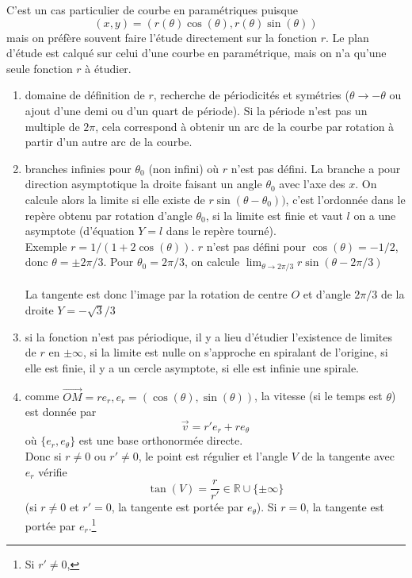 \documentclass[a4paper,11pt]{book}
\begin{document}
\begin{giacjshere}
C'est un cas particulier de courbe en param\'etriques puisque
$$ (x,y)=(r(\theta) \cos(\theta), r(\theta) \sin(\theta))$$
mais on pr\'ef\`ere souvent faire l'\'etude directement sur la
fonction $r$. Le plan d'\'etude est calqu\'e sur celui
d'une courbe en param\'etrique, mais on n'a qu'une seule fonction
$r$ \`a \'etudier.
\begin{enumerate}
\item domaine de d\'efinition de $r$, recherche
de p\'eriodicit\'es et sym\'etries ($\theta \rightarrow -\theta$
ou ajout d'une demi ou d'un quart de p\'eriode).
Si la période n'est pas un multiple de $2\pi$, cela correspond
à obtenir un arc de la courbe par rotation à partir d'un autre arc
de la courbe.
\item branches infinies pour $\theta_0$ (non infini)
où $r$ n'est pas d\'efini. La branche a pour direction
asymptotique la droite faisant un angle $\theta_0$ avec
l'axe des $x$. On calcule alors la limite si elle existe de 
$r \sin(\theta-\theta_0))$, c'est l'ordonnée dans
le repère obtenu par rotation d'angle $\theta_0$, si la limite
est finie et vaut $l$
on a une asymptote (d'équation $Y=l$ dans le repère tourné).\\
Exemple $r=1/(1+2\cos(\theta))$. $r$ n'est pas d\'efini pour
$\cos(\theta)=-1/2$, donc $\theta=\pm 2\pi/3$. Pour $\theta_0=2\pi/3$,
on calcule $\lim_{\theta \rightarrow 2\pi/3}r\sin(\theta-2\pi/3)$\\
\\
La tangente est donc l'image par la rotation de centre $O$ et d'angle
$2\pi/3$ de la droite $Y=-\sqrt{3}/3$
\item si la fonction n'est pas périodique, il y a lieu
d'étudier l'existence de limites de $r$ en $\pm \infty$, si la limite
est nulle on s'approche en spiralant de l'origine, si
elle est finie, il y a un cercle asymptote, si elle est
infinie une spirale.
\item comme $\overrightarrow{OM}=r e_r, 
e_r=(\cos(\theta),\sin(\theta))$, 
la vitesse (si le temps est $\theta$) est donnée par 
$$\overrightarrow{v}= r' e_r + r e_\theta$$
où $\{ e_r,e_\theta \}$ est une base orthonormée directe.\\
Donc si $r\neq 0$ ou $r' \neq 0$, le point est régulier et
l'angle $V$ de la tangente avec $e_r$ vérifie 
$$\tan(V)=\frac{r}{r'} \in \mathbb{R} \cup \{ \pm \infty \} $$
(si $r \neq 0$ et $r'=0$, la tangente est portée par $e_\theta$).
Si $r=0$, la tangente est portée par $e_r$.\footnote{Si $r'\neq 0$,
}
\end{enumerate}
\end{giacjshere}
\end{document}

